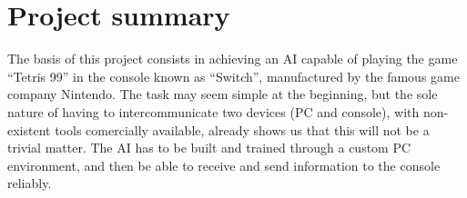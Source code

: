 
\chapter{Project summary}

The basis of this project consists in achieving an \ac{AI} capable of playing the game “Tetris 99” in the console known as “Switch”, manufactured by the famous game company Nintendo. The task may seem simple at the beginning, but the sole nature of having to intercommunicate two devices (PC and console), with non-existent tools comercially available, already shows us that this will not be a trivial matter. The AI has to be built and trained through a custom PC environment, and then be able to receive and send information to the console reliably.